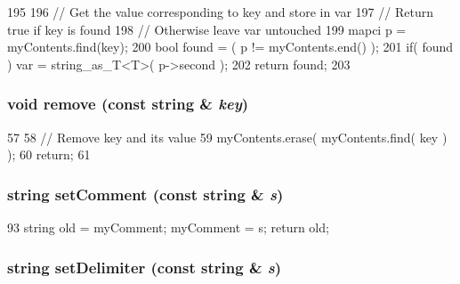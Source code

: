 \begin{DoxyCode}
195 {
196         // Get the value corresponding to key and store in var
197         // Return true if key is found
198         // Otherwise leave var untouched
199         mapci p = myContents.find(key);
200         bool found = ( p != myContents.end() );
201         if( found ) var = string_as_T<T>( p->second );
202         return found;
203 }
\end{DoxyCode}
\hypertarget{classConfigFile_ab700f16011dd07b6f97e8742209a177d}{
\subsubsection[{remove}]{\setlength{\rightskip}{0pt plus 5cm}void remove (const string \& {\em key})}}
\label{classConfigFile_ab700f16011dd07b6f97e8742209a177d}



\begin{DoxyCode}
57 {
58     // Remove key and its value
59     myContents.erase( myContents.find( key ) );
60     return;
61 }
\end{DoxyCode}
\hypertarget{classConfigFile_acd6365b5496ff99970ccde0c800202ef}{
\subsubsection[{setComment}]{\setlength{\rightskip}{0pt plus 5cm}string setComment (const string \& {\em s})}}
\label{classConfigFile_acd6365b5496ff99970ccde0c800202ef}



\begin{DoxyCode}
93                 { string old = myComment;  myComment = s;  return old; }
\end{DoxyCode}
\hypertarget{classConfigFile_a3b1fedd0dc8fe87a03fb4f09ad6c93ae}{
\subsubsection[{setDelimiter}]{\setlength{\rightskip}{0pt plus 5cm}string setDelimiter (const string \& {\em s})}}
\label{classConfigFile_a3b1fedd0dc8fe87a03fb4f09ad6c93ae}



